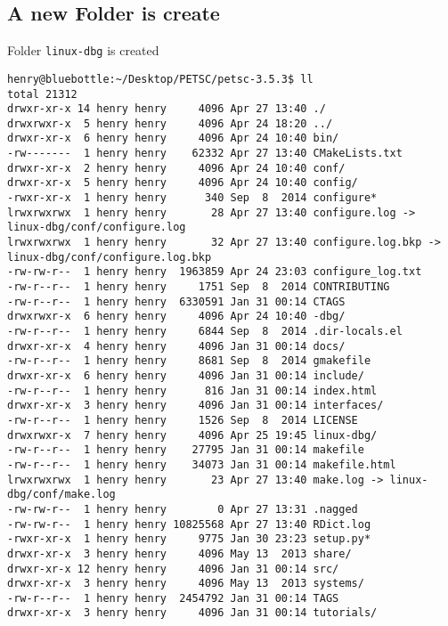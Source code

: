 \documentclass{article}
\begin{document}
\subsection{A new Folder is create} Folder \verb+linux-dbg+ is created
\begin{scriptsize}\begin{verbatim}
henry@bluebottle:~/Desktop/PETSC/petsc-3.5.3$ ll
total 21312
drwxr-xr-x 14 henry henry     4096 Apr 27 13:40 ./
drwxrwxr-x  5 henry henry     4096 Apr 24 18:20 ../
drwxr-xr-x  6 henry henry     4096 Apr 24 10:40 bin/
-rw-------  1 henry henry    62332 Apr 27 13:40 CMakeLists.txt
drwxr-xr-x  2 henry henry     4096 Apr 24 10:40 conf/
drwxr-xr-x  5 henry henry     4096 Apr 24 10:40 config/
-rwxr-xr-x  1 henry henry      340 Sep  8  2014 configure*
lrwxrwxrwx  1 henry henry       28 Apr 27 13:40 configure.log -> linux-dbg/conf/configure.log
lrwxrwxrwx  1 henry henry       32 Apr 27 13:40 configure.log.bkp -> linux-dbg/conf/configure.log.bkp
-rw-rw-r--  1 henry henry  1963859 Apr 24 23:03 configure_log.txt
-rw-r--r--  1 henry henry     1751 Sep  8  2014 CONTRIBUTING
-rw-r--r--  1 henry henry  6330591 Jan 31 00:14 CTAGS
drwxrwxr-x  6 henry henry     4096 Apr 24 10:40 -dbg/
-rw-r--r--  1 henry henry     6844 Sep  8  2014 .dir-locals.el
drwxr-xr-x  4 henry henry     4096 Jan 31 00:14 docs/
-rw-r--r--  1 henry henry     8681 Sep  8  2014 gmakefile
drwxr-xr-x  6 henry henry     4096 Jan 31 00:14 include/
-rw-r--r--  1 henry henry      816 Jan 31 00:14 index.html
drwxr-xr-x  3 henry henry     4096 Jan 31 00:14 interfaces/
-rw-r--r--  1 henry henry     1526 Sep  8  2014 LICENSE
drwxrwxr-x  7 henry henry     4096 Apr 25 19:45 linux-dbg/
-rw-r--r--  1 henry henry    27795 Jan 31 00:14 makefile
-rw-r--r--  1 henry henry    34073 Jan 31 00:14 makefile.html
lrwxrwxrwx  1 henry henry       23 Apr 27 13:40 make.log -> linux-dbg/conf/make.log
-rw-rw-r--  1 henry henry        0 Apr 27 13:31 .nagged
-rw-rw-r--  1 henry henry 10825568 Apr 27 13:40 RDict.log
-rwxr-xr-x  1 henry henry     9775 Jan 30 23:23 setup.py*
drwxr-xr-x  3 henry henry     4096 May 13  2013 share/
drwxr-xr-x 12 henry henry     4096 Jan 31 00:14 src/
drwxr-xr-x  3 henry henry     4096 May 13  2013 systems/
-rw-r--r--  1 henry henry  2454792 Jan 31 00:14 TAGS
drwxr-xr-x  3 henry henry     4096 Jan 31 00:14 tutorials/
\end{verbatim}\end{scriptsize}
\end{document}

